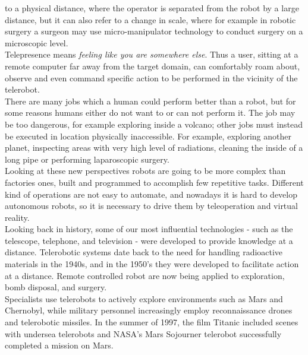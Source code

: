 to a physical distance, where the operator is separated from the robot
by a large distance, but it can also refer to a change in scale, where
for example in robotic surgery a surgeon may use micro-manipulator
technology to conduct surgery on a microscopic level.
\\
Telepresence means \textit{feeling like you are somewhere else}.
Thus a user, sitting at a remote computer far away from the target
domain, can comfortably roam about, observe and even command
specific action to be performed in the vicinity of the telerobot.
\\
There are many jobs which a human could perform better than a robot, but
for some reasons humans either do not want to or can not perform it.
The job may be too dangerous, for example exploring inside a volcano;
other jobs must instead be executed in location physically inaccessible.
For example, exploring another planet, inspecting areas with very high
level of radiations, cleaning the inside of a long pipe or performing
laparoscopic surgery.
\\
Looking at these new perspectives robots are going to be more complex
than factories ones, built and programmed to accomplish few repetitive
tasks. Different kind of operations are not easy
to automate, and nowadays it is hard to develop autonomous robots, so
it is necessary to drive them by teleoperation and virtual reality.
\\
Looking back in history, some of our most influential technologies
- such as the telescope,
telephone, and television - were developed to provide knowledge
at a distance. Telerobotic systems date back to the need for handling
radioactive materials in the 1940s, and in the 1950's they were developed
to facilitate action at a distance. Remote controlled robot are now
being applied to exploration, bomb disposal, and surgery.
\\
Specialists use telerobots to actively explore environments such
as Mars and Chernobyl, while military personnel increasingly employ
reconnaissance drones and telerobotic missiles.
In the summer of 1997, the film Titanic included scenes with undersea
telerobots and NASA's Mars Sojourner telerobot successfully
completed a mission on Mars.
